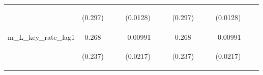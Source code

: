 \documentclass[]{article}
\begin{document}
\begin{center}
\begin{tabular}{lcccccccccccc}
\vspace{4pt} & \begin{footnotesize}(0.297)\end{footnotesize} & \begin{footnotesize}\end{footnotesize} & \begin{footnotesize}\end{footnotesize} & \begin{footnotesize}(0.0128)\end{footnotesize} & \begin{footnotesize}\end{footnotesize} & \begin{footnotesize}\end{footnotesize} & \begin{footnotesize}(0.297)\end{footnotesize} & \begin{footnotesize}\end{footnotesize} & \begin{footnotesize}\end{footnotesize} & \begin{footnotesize}(0.0128)\end{footnotesize} & \begin{footnotesize}\end{footnotesize} & \begin{footnotesize}\end{footnotesize} \\
m\_L\_key\_rate\_lag1 & 0.268 &  &  & -0.00991 &  &  & 0.268 &  &  & -0.00991 &  &  \\
\vspace{4pt} & \begin{footnotesize}(0.237)\end{footnotesize} & \begin{footnotesize}\end{footnotesize} & \begin{footnotesize}\end{footnotesize} & \begin{footnotesize}(0.0217)\end{footnotesize} & \begin{footnotesize}\end{footnotesize} & \begin{footnotesize}\end{footnotesize} & \begin{footnotesize}(0.237)\end{footnotesize} & \begin{footnotesize}\end{footnotesize} & \begin{footnotesize}\end{footnotesize} & \begin{footnotesize}(0.0217)\end{footnotesize} & \begin{footnotesize}\end{footnotesize} & \begin{footnotesize}\end{footnotesize} \\

\end{tabular}
\end{center}
\end{document}
